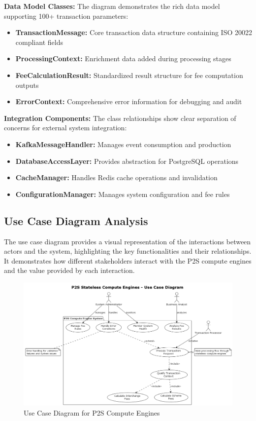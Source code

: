 \textbf{Data Model Classes:}
The diagram demonstrates the rich data model supporting 100+ transaction parameters:
\begin{itemize}
    \item \textbf{TransactionMessage:} Core transaction data structure containing ISO 20022 compliant fields
    \item \textbf{ProcessingContext:} Enrichment data added during processing stages
    \item \textbf{FeeCalculationResult:} Standardized result structure for fee computation outputs
    \item \textbf{ErrorContext:} Comprehensive error information for debugging and audit
\end{itemize}

\textbf{Integration Components:}
The class relationships show clear separation of concerns for external system integration:
\begin{itemize}
    \item \textbf{KafkaMessageHandler:} Manages event consumption and production
    \item \textbf{DatabaseAccessLayer:} Provides abstraction for PostgreSQL operations
    \item \textbf{CacheManager:} Handles Redis cache operations and invalidation
    \item \textbf{ConfigurationManager:} Manages system configuration and fee rules
\end{itemize}



\subsection{Use Case Diagram Analysis}

The use case diagram provides a visual representation of the interactions between actors and the system, highlighting the key functionalities and their relationships. It demonstrates how different stakeholders interact with the P2S compute engines and the value provided by each interaction.

\begin{figure}[H]
    \centering
    \includegraphics[width=1.05\textwidth]{out/diagrams/plantuml/in/use-case/use-case.png}
    \caption{Use Case Diagram for P2S Compute Engines}
    \label{fig:use_case_diagram}
\end{figure}

